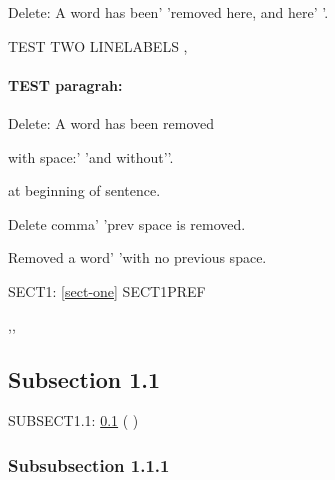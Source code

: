 \documentclass[a4paper,12pt]{report}
\makeatletter
\def\linenumbers{}
\def\linenumbers{}
\def\linelabel#1{}
\def\lineref#1{}
\newcommand{\getCurrentSectionNumber}{%
  \ifnum\c@section=0 %
  \thechapter
  \else
  \ifnum\c@subsection=0 %
  \thesection
  \else
  \ifnum\c@subsubsection=0 %
  \thesubsection
  \else
  \thesubsubsection
  \fi
  \fi
  \fi
}
\makeatother
\begin{document}

Delete: A word has been'  'removed here, and here' '.




 

TEST \linelabel{linetestone} TWO \linelabel{linetesttwo} LINELABELS \lineref{linetestone}, \lineref{linetesttwo} \pageref{linetesttwo}


\paragraph{TEST paragrah:}

Delete: A word has been removed

with space:'  'and without''.

  at beginning of sentence.

Delete comma'\erratumDelete{,} 'prev space is removed.

Removed a word' 'with no previous space.



SECT1: \cref{sect-one}
SECT1PREF 


,,


\subsection{Subsection 1.1}\label{subsect-one}



SUBSECT1.1: \cref{subsect-one} (\getCurrentSectionNumber)





\subsubsection{Subsubsection 1.1.1}\label{subsubsect-one}
\end{document}
